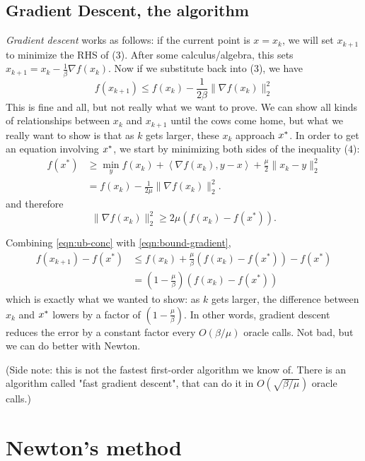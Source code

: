 \documentclass[11pt]{article}
\newcommand{\inprod}[1]{\left\langle #1 \right\rangle}
\begin{document}
\subsection{Gradient Descent, the algorithm}
{\em Gradient descent} works as follows: if the current point is $x = x_k$, we will set $x_{k+1}$ to minimize the RHS of (3). After some calculus/algebra, this sets $x_{k+1} = x_k - \frac 1\beta \nabla f(x_k)$. Now if we substitute back into (3), we have
\begin{equation}
f(x_{k+1}) \le f(x_k) - \frac 1{2\beta} \|\nabla f(x_k)\|_2^2 \label{eqn:ub-conc}
\end{equation}
This is fine and all, but not really what we want to prove. We can show all kinds of relationships between $x_k$ and $x_{k+1}$ until the cows come home, but what we really want to show is that as $k$ gets larger, these $x_k$ approach $x^*$. In order to get an equation involving $x^*$, we start by minimizing both sides of the inequality (4):
\begin{align*}
f(x^*) &\ge \min_y f(x_k) + \inprod{\nabla f(x_k), y-x} + \frac {\mu}2\|x_k - y\|_2^2\\
{}&= f(x_k) - \frac 1{2\mu} \|\nabla f(x_k)\|_2^2 . 
\end{align*}
and therefore
\begin{equation}
\|\nabla f(x_k)\|_2^2 \ge 2\mu(f(x_k) - f(x^*)) .\label{eqn:bound-gradient}
\end{equation}

Combining \eqref{eqn:ub-conc} with \eqref{eqn:bound-gradient},
\begin{align*}
f(x_{k+1}) - f(x^*) &\le f(x_k) + \frac{\mu}\beta (f(x_k) - f(x^*)) - f(x^*)\\
{}& = (1 - \frac{\mu}\beta)(f(x_k) - f(x^*))
\end{align*}
which is exactly what we wanted to show: as $k$ gets larger, the difference between $x_k$ and $x^*$ lowers by a factor of $(1 - \frac{\mu}\beta)$. In other words, gradient descent reduces the error by a constant factor every $O(\beta/\mu)$ oracle calls. Not bad, but we can do better with Newton.

(Side note: this is not the fastest first-order algorithm we know of. There is an algorithm called "fast gradient descent", that can do it in $O(\sqrt{\beta/\mu})$ oracle calls.)

\section{Newton's method}
\end{document}
